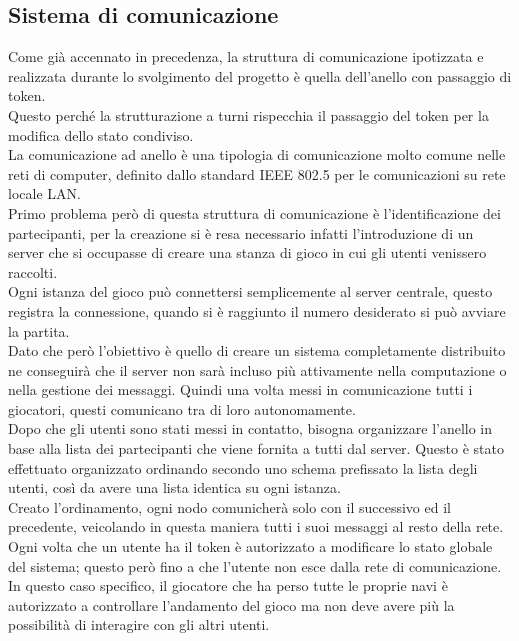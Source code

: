 \documentclass{llncs}
\begin{document}
\subsection{Sistema di comunicazione}
Come già accennato in precedenza, la struttura di comunicazione ipotizzata e realizzata durante lo svolgimento del progetto è quella dell'anello con passaggio di token.\\
Questo perché la strutturazione a turni rispecchia il passaggio del token per la modifica dello stato condiviso.\\
La comunicazione ad anello è una tipologia di comunicazione molto comune nelle reti di computer, definito dallo standard IEEE 802.5 per le comunicazioni su rete locale LAN.\\
Primo problema però di questa struttura di comunicazione è l'identificazione dei partecipanti, per la creazione si è resa necessario infatti l'introduzione di un server che si occupasse di creare una stanza di gioco in cui gli utenti venissero raccolti.\\
Ogni istanza del gioco può connettersi semplicemente al server centrale, questo registra la connessione, quando si è raggiunto il numero desiderato si può avviare la partita.\\
Dato che però l'obiettivo è quello di creare un sistema completamente distribuito ne conseguirà che il server non sarà incluso più attivamente nella computazione o nella gestione dei messaggi. Quindi una volta messi in comunicazione tutti i giocatori, questi comunicano tra di loro autonomamente.\\
Dopo che gli utenti sono stati messi in contatto, bisogna organizzare l'anello in base alla lista dei partecipanti che viene fornita a tutti dal server. Questo è stato effettuato organizzato ordinando secondo uno schema prefissato la lista degli utenti, così da avere una lista identica su ogni istanza.\\
Creato l'ordinamento, ogni nodo comunicherà solo con il successivo ed il precedente, veicolando in questa maniera tutti i suoi messaggi al resto della rete.\\
Ogni volta che un utente ha il token è autorizzato a modificare lo stato globale del sistema; questo però fino a che l'utente non esce dalla rete di comunicazione. In questo caso specifico, il giocatore che ha perso tutte le proprie navi è autorizzato a controllare l'andamento del gioco ma non deve avere più la possibilità di interagire con gli altri utenti.
\end{document}
